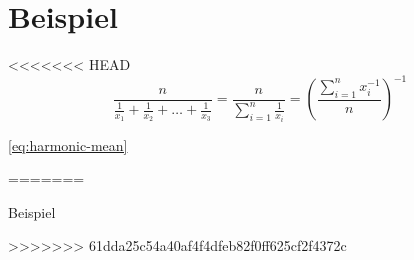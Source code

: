 \section{Beispiel}

<<<<<<< HEAD
\begin{equation}
	\frac{n}{\frac{1}{x_1}+\frac{1}{x_2}+\ldots+\frac{1}{x_3}}=\frac{n}{\displaystyle\sum_{i=1}^{n}\frac{1}{x_i}}=\left(\frac{\displaystyle\sum_{i=1}^{n}x_i^{-1}}{n}\right)^{-1}
	\label{eq:harmonic-mean}
\end{equation}

\autoref{eq:harmonic-mean}

\cite{Korte2018}
=======


Beispiel


\cite{korte2018}

>>>>>>> 61dda25c54a40af4f4dfeb82f0ff625cf2f4372c
